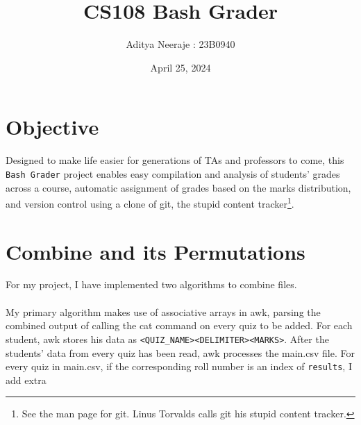 \documentclass{article}
\title{CS108 Bash Grader}
\author{Aditya Neeraje : 23B0940}
\date{April 25, 2024}
\begin{document}
    \maketitle
    \pagebreak
    \tableofcontents
    \section{Objective}
    Designed to make life easier for generations of TAs and professors to come, this \texttt{Bash Grader} project enables easy compilation and analysis of students' grades across a course, automatic assignment of grades based on the marks distribution, and version control using a clone of git, the stupid content tracker\footnote{See the man page for git. Linus Torvalds calls git his stupid content tracker.}.

    \section{Combine and its Permutations}
    For my project, I have implemented two algorithms to combine files.
    \\
    \\
    My primary algorithm makes use of associative arrays in awk, parsing the combined output of calling the cat command on every quiz to be added. For each student, awk stores his data as \texttt{<QUIZ\_NAME><DELIMITER><MARKS>}. After the students' data from every quiz has been read, awk processes the main.csv file. For every quiz in main.csv, if the corresponding roll number is an index of \texttt{results}, I add extra 
\end{document}
